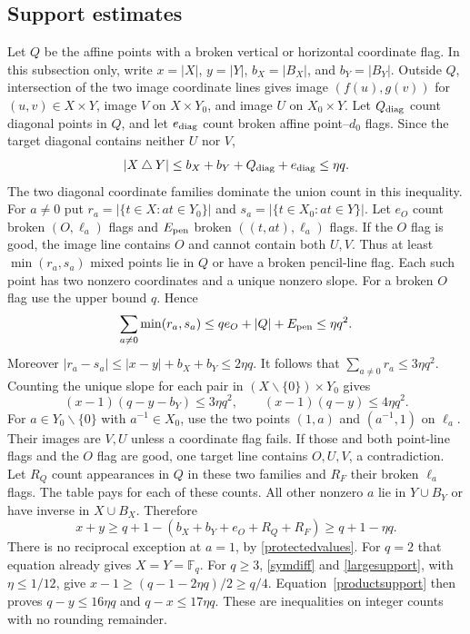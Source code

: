 \documentclass[11pt]{article}
\newcommand{\F}{\mathbb F}
\begin{document}
\subsection{Support estimates}
Let $Q$ be the affine points with a broken vertical or horizontal
coordinate flag. In this subsection only, write $x=|X|$, $y=|Y|$,
$b_X=|B_X|$, and $b_Y=|B_Y|$. Outside $Q$, intersection of the two image
coordinate lines gives image $(f(u),g(v))$ for $(u,v)\in X\times Y$,
image $V$ on $X\times Y_0$, and image $U$ on $X_0\times Y$.
Let $Q_{\rm diag}$ count diagonal points in $Q$, and let $e_{\rm diag}$
count broken affine point--$d_0$ flags. Since the target diagonal contains
neither $U$ nor $V$,
\begin{equation}\label{symdiff}
 |X\mathbin{\triangle} Y|\leq b_X+b_Y+Q_{\rm diag}+e_{\rm diag}\leq\eta q.
\end{equation}
The two diagonal coordinate families dominate the union count in this inequality.
For $a\ne0$ put
$r_a=|\{t\in X:at\in Y_0\}|$ and
$s_a=|\{t\in X_0:at\in Y\}|$.
Let $e_O$ count broken $(O,\ell_a)$ flags and $E_{\rm pen}$ broken
$((t,at),\ell_a)$ flags. If the $O$ flag is good, the image line contains
$O$ and cannot contain both $U,V$. Thus at least $\min(r_a,s_a)$ mixed
points lie in $Q$ or have a broken pencil-line flag. Each such point has
two nonzero coordinates and a unique nonzero slope. For a broken $O$
flag use the upper bound $q$. Hence
\begin{equation}\label{mixed}
 \sum_{a\ne0}\min(r_a,s_a)\leq qe_O+|Q|+E_{\rm pen}\leq\eta q^2.
\end{equation}
Moreover $|r_a-s_a|\leq|x-y|+b_X+b_Y\leq2\eta q$. It follows that
$\sum_{a\ne0}r_a\leq3\eta q^2$. Counting the unique slope for each pair
in $(X\smallsetminus\{0\})\times Y_0$ gives
\begin{equation}\label{productsupport}
 (x-1)(q-y-b_Y)\leq3\eta q^2,\qquad (x-1)(q-y)\leq4\eta q^2.
\end{equation}
For $a\in Y_0\smallsetminus\{0\}$ with $a^{-1}\in X_0$, use the two points
$(1,a)$ and $(a^{-1},1)$ on $\ell_a$. Their images are $V,U$ unless a
coordinate flag fails. If those and both point-line flags and the $O$
flag are good, one target line contains $O,U,V$, a contradiction.
Let $R_Q$ count appearances in $Q$ in these two families and $R_F$ their
broken $\ell_a$ flags. The table pays for each of these counts. All other
nonzero $a$ lie in $Y\cup B_Y$ or have inverse in $X\cup B_X$. Therefore
\begin{equation}\label{largesupport}
 x+y\geq q+1-(b_X+b_Y+e_O+R_Q+R_F)\geq q+1-\eta q.
\end{equation}
There is no reciprocal exception at $a=1$, by \eqref{protectedvalues}.
For $q=2$ that equation already gives $X=Y=\F_q$. For $q\geq3$,
\eqref{symdiff} and \eqref{largesupport}, with $\eta\leq1/12$, give
$x-1\geq(q-1-2\eta q)/2\geq q/4$. Equation~\eqref{productsupport}
then proves $q-y\leq16\eta q$ and $q-x\leq17\eta q$.
These are inequalities on integer counts with no rounding remainder.
\end{document}
